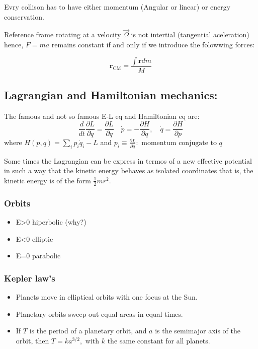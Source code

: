 Evry collison has to have either momentum (Angular or linear) or energy conservation.


Reference frame rotating at a velocity $\vec{
   \Omega 
}$ is not intertial (tangential aceleration) hence, $F=ma$ remains constant if and only if we introduce the folowwing forces:


    $$\boxed{\mathbf{r}_{\mathrm{CM}}=\frac{\int \mathbf{r} d m}{M}}$$



    \subsection{Lagrangian and Hamiltonian mechanics:}
    The famous and not so famous E-L eq and Hamiltonian eq are:
    $$\boxed{\frac{d}{d t} \frac{\partial L}{\partial \dot{q}}=\frac{\partial L}{\partial q} \quad \dot{p}=-\frac{\partial H}{\partial q}, \quad \dot{q}=\frac{\partial H}{\partial p}}$$
where $\boxed{H(p, q)=\sum_{i} p_{i} \dot{q}_{i}-L}$ and $ p_{i} \equiv \frac{\partial L}{\partial \dot{q}}: \text { momentum conjugate to } q$

Some times the Lagrangian can be express in termos of a new effective potential in such a way that the kinetic energy behaves as isolated coordinates that is, the kinetic energy is of the form $\frac{1}{2}mr^2$.

\subsubsection{Orbits}

\begin{itemize}
    \item E>0 hiperbolic (why?)
    \item E<0 elliptic
    \item E=0 parabolic
\end{itemize}

\subsubsection{Kepler law's}
\begin{itemize}
    \item Planets move in elliptical orbits with one focus at the Sun.
    \item Planetary orbits sweep out equal areas in equal times.
    \item If $T$ is the period of a planetary orbit, and $a$ is the semimajor axis of the orbit, then $T=k a^{3 / 2},$ with $k$ the same
    constant for all planets.
\end{itemize}


